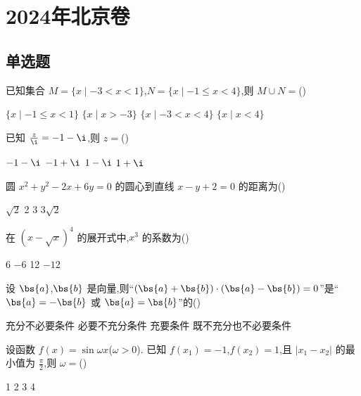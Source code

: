 \chapter{2024年北京卷}

\section{单选题}

\begin{problem}
已知集合 \(M=\{x\mid -3<x<1\}\),\(N=\{x\mid -1\le x<4\}\),则 \(M\cup N=\)(\quad)

\choices
    {\(\{x\mid -1\le x<1\}\)}
    {\(\{x\mid x>-3\}\)}
    {\(\{x\mid -3<x<4\}\)}
    {\(\{x\mid x<4\}\)}
\end{problem}

\begin{problem}
已知 \(\frac{z}{\i}=-1-\i\),则 \(z=\)(\quad)

\choices
    {\(-1-\i\)}
    {\(-1+\i\)}
    {\(1-\i\)}
    {\(1+\i\)}
\end{problem}

\begin{problem}
圆 \(x^2+y^2-2x+6y=0\) 的圆心到直线 \(x-y+2=0\) 的距离为(\quad)

\choices
    {\(\sqrt{2}\)}
    {2}
    {3}
    {\(3\sqrt{2}\)}
\end{problem}

\begin{problem}
在 \(\left( x-\sqrt{x} \right)^4\) 的展开式中,\(x^3\) 的系数为(\quad)

\choices
    {6}
    {\(-6\)}
    {12}
    {\(-12\)}
\end{problem}

\begin{problem}
设 \(\bs{a}\),\(\bs{b}\) 是向量,则``\(\left( \bs{a}+\bs{b} \right)\cdot\left( \bs{a}-\bs{b} \right)=0\)''是``\(\bs{a}=-\bs{b}\) 或 \(\bs{a}=\bs{b}\)''的(\quad)

\choices
    {充分不必要条件}
    {必要不充分条件}
    {充要条件}
    {既不充分也不必要条件}
\end{problem}

\begin{problem}
设函数 \(f(x)=\sin \omega x\)(\(\omega>0\)). 已知 \(f(x_1)=-1\),\(f(x_2)=1\),且 \(\lvert x_1-x_2\rvert\) 的最小值为 \(\frac{\pi}{2}\),则 \(\omega=\)(\quad)

\choices
    {1}
    {2}
    {3}
    {4}
\end{problem}

